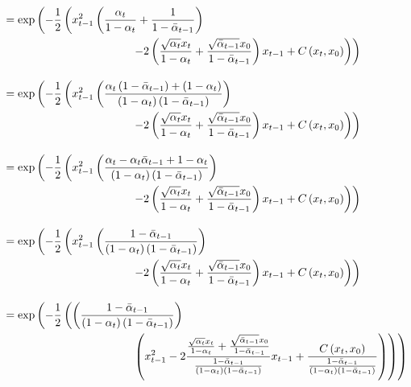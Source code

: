 \documentclass{article}
\numberwithin{equation}{section}
\numberwithin{figure}{section}
\begin{document}
\begin{align}
  &= \exp\left(- \frac{1}{2} \left(x_{t-1}^2 \left(\frac{\alpha_t}{1 - \alpha_t} + \frac{1}{1 - \bar{\alpha}_{t-1}}\right) \right. \right. \\
  &\hspace{4cm} \left. \left. - 2\left(\frac{\sqrt{\alpha_t} x_t}{1 - \alpha_t} + \frac{\sqrt{\bar{\alpha}_{t-1}} x_0}{1 - \bar{\alpha}_{t-1}}\right) x_{t-1} + C\left(x_t, x_0\right) \right) \right) \notag \\[10pt]
  &= \exp\left(- \frac{1}{2} \left(x_{t-1}^2 \left(\frac{\alpha_t \left(1 - \bar{\alpha}_{t-1}\right) + \left(1 - \alpha_t\right)}{\left(1 - \alpha_t\right)\left(1 - \bar{\alpha}_{t-1}\right)}\right) \right. \right. \\
  &\hspace{4cm} \left. \left. - 2\left(\frac{\sqrt{\alpha_t} x_t}{1 - \alpha_t} + \frac{\sqrt{\bar{\alpha}_{t-1}} x_0}{1 - \bar{\alpha}_{t-1}}\right) x_{t-1} + C\left(x_t, x_0\right) \right) \right) \notag \\[10pt]
  &= \exp\left(- \frac{1}{2} \left(x_{t-1}^2 \left(\frac{\alpha_t - \alpha_t \bar{\alpha}_{t-1} + 1 - \alpha_t}{\left(1 - \alpha_t\right)\left(1 - \bar{\alpha}_{t-1}\right)}\right) \right. \right. \\
  &\hspace{4cm} \left. \left. - 2\left(\frac{\sqrt{\alpha_t} x_t}{1 - \alpha_t} + \frac{\sqrt{\bar{\alpha}_{t-1}} x_0}{1 - \bar{\alpha}_{t-1}}\right) x_{t-1} + C\left(x_t, x_0\right) \right) \right) \notag \\[10pt]
  &= \exp\left(- \frac{1}{2} \left(x_{t-1}^2 \left(\frac{1 - \bar{\alpha}_{t-1}}{\left(1 - \alpha_t\right)\left(1 - \bar{\alpha}_{t-1}\right)}\right) \right. \right. \\
  &\hspace{4cm} \left. \left. - 2\left(\frac{\sqrt{\alpha_t} x_t}{1 - \alpha_t} + \frac{\sqrt{\bar{\alpha}_{t-1}} x_0}{1 - \bar{\alpha}_{t-1}}\right) x_{t-1} + C\left(x_t, x_0\right) \right) \right) \notag \\[10pt]
  &= \exp\left(- \frac{1}{2} \left( \left(\frac{1 - \bar{\alpha}_{t-1}}{\left(1 - \alpha_t\right)\left(1 - \bar{\alpha}_{t-1}\right)}\right)  \right. \right. \\
  &\hspace{4cm} \left. \left. \left(x_{t-1}^2 - 2 \frac{\frac{\sqrt{\alpha_t}x_t}{1 - \alpha_t} + \frac{\sqrt{\bar{\alpha}_{t-1}} x_0}{1 - \bar{\alpha}_{t-1}}}{\frac{1 - \bar{\alpha}_{t-1}}{\left(1 - \alpha_t\right)\left(1 - \bar{\alpha}_{t-1}\right)}} x_{t-1} + \frac{C\left(x_t, x_0\right)}{\frac{1 - \bar{\alpha}_{t-1}}{\left(1 - \alpha_t\right)\left(1 - \bar{\alpha}_{t-1}\right)}}\right) \right) \right) \notag \\[10pt]

\end{align}
\end{document}
